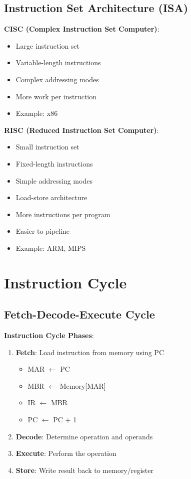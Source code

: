\documentclass[12pt,a4paper]{report}
\begin{document}
\subsection{Instruction Set Architecture (ISA)}
\begin{concept}
\textbf{CISC (Complex Instruction Set Computer)}:
\begin{itemize}
    \item Large instruction set
    \item Variable-length instructions
    \item Complex addressing modes
    \item More work per instruction
    \item Example: x86
\end{itemize}

\textbf{RISC (Reduced Instruction Set Computer)}:
\begin{itemize}
    \item Small instruction set
    \item Fixed-length instructions
    \item Simple addressing modes
    \item Load-store architecture
    \item More instructions per program
    \item Easier to pipeline
    \item Example: ARM, MIPS
\end{itemize}
\end{concept}

\section{Instruction Cycle}

\subsection{Fetch-Decode-Execute Cycle}
\begin{concept}
\textbf{Instruction Cycle Phases}:
\begin{enumerate}
    \item \textbf{Fetch}: Load instruction from memory using PC
        \begin{itemize}
            \item MAR $\leftarrow$ PC
            \item MBR $\leftarrow$ Memory[MAR]
            \item IR $\leftarrow$ MBR
            \item PC $\leftarrow$ PC + 1
        \end{itemize}
    \item \textbf{Decode}: Determine operation and operands
    \item \textbf{Execute}: Perform the operation
    \item \textbf{Store}: Write result back to memory/register
\end{enumerate}
\end{concept}
\end{document}
